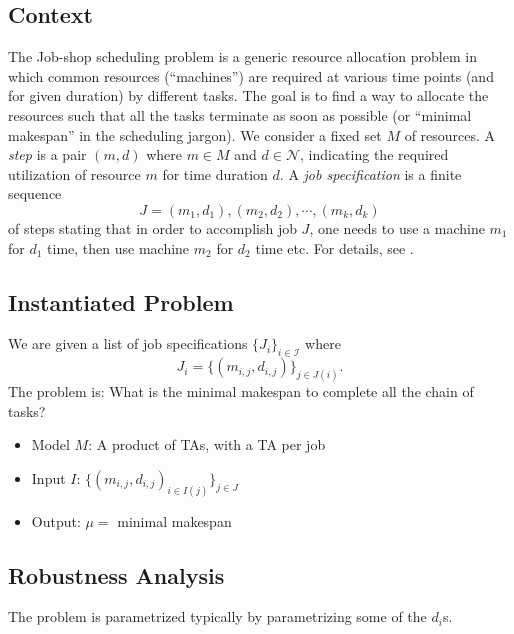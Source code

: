 \documentclass{article}
\begin{document}
\subsection{Context}
The Job-shop scheduling problem is a generic resource allocation problem in which common
resources (``machines'') are required at various time points (and for given duration) by different tasks. The goal is to find a way to allocate the resources such that all the tasks terminate
as soon as possible (or ``minimal makespan'' in the scheduling jargon). We consider a fixed set $M$ of resources. A \emph{step} is a pair $(m,d)$ where $m \in M$ and $d \in \mathcal{N}$, indicating 
the required utilization of resource $m$ for time duration $d$. A \emph{job specification} is a finite sequence
$$J = (m_1,d_1),(m_2,d_2),\cdots, (m_k,d_k)$$ of steps stating that in order to accomplish job $J$, one needs to use a machine $m_1$ for $d_1$ time, then use machine $m_2$ for $d_2$ time etc. For details, see \cite{am02}.
% 

\subsection{Instantiated Problem}
We are given a list of job specifications $\{J_i\}_{i \in \mathcal{I}}$ where $$J_i =\{(m_{i,j},d_{i,j})\}_{j \in J(i)}.$$ 
The problem is: What is the minimal makespan to complete all the chain of tasks?
\begin{itemize}
 \item Model $M$: A product of TAs, with a TA per job
 \item Input $I$:  $\{(m_{i,j},d_{i,j})_{i\in I(j)}\}_{j \in J}$
 \item Output: $\mu =$ minimal makespan
\end{itemize}


\subsection{Robustness Analysis}
The problem is parametrized typically by parametrizing some of the $d_i$s.
\end{document}
